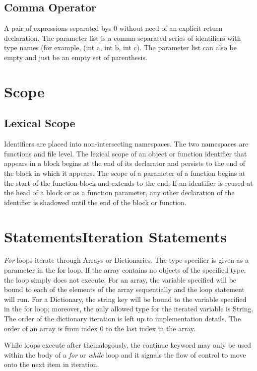 \documentclass[12pt]{article}
\begin{document}
\subsection{Comma Operator}
A pair of expressions separated bys 0 without need of an explicit return declaration. 
The parameter list is a comma-separated series of identifiers with type names (for example, (int a, int b, int c).  The parameter list can also be empty and just be an empty set of parenthesis. 

\section{Scope}

\subsection{Lexical Scope}
Identifiers are placed into non-intersecting namespaces.  The two namespaces are functions and file level.  The lexical scope of an object or function identifier that appears in a block begins at the end of its declarator and persists to the end of the block in which it appears.  The scope of a parameter of a function begins at the start of the function block and extends to the end.  If an identifier is reused at the head of a block or as a function parameter, any other declaration of the identifier is shadowed until the end of the block or function. 

\section{StatementsIteration Statements}

\textit{For} loops iterate through Arrays or Dictionaries.  The type specifier is given as a parameter in the for loop.  If the array contains no objects of the specified type, the loop simply does not execute.  For an array, the variable specified will be bound to each of the elements of the array sequentially and the loop statement will run.  For a Dictionary, the string key will be bound to the variable specified in the for loop; moreover, the only allowed type for the iterated variable is String.  The order of the dictionary iteration is left up to implementation details.  The order of an array is from index 0 to the last index in the array.

While loops execute after theinalogously, the continue keyword may only be used within the body of a \textit{for} or \textit{while} loop and it signals the flow of control to move onto the next item in iteration. 
\end{document}
